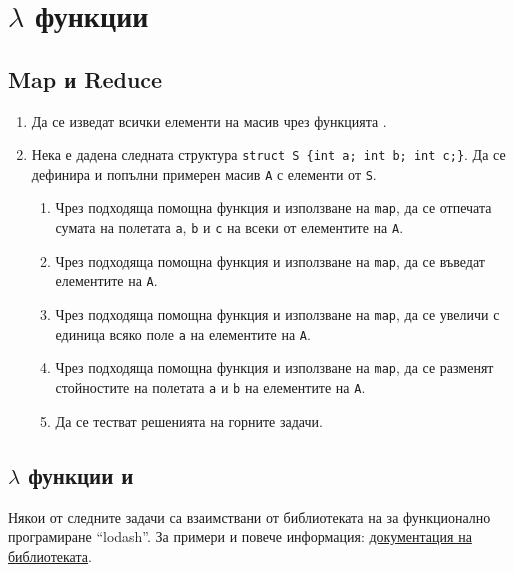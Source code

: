\pagebreak

\clearpage

\section{$\lambda$ функции}

\subsection {Map и Reduce}

\begin{enumerate}[]  
  \item Да се изведат всички елементи на масив чрез функцията .
  
  \item Нека е дадена следната структура \texttt{struct S \{int a; int b; int c;\}}. Да се дефинира и попълни примерен масив \texttt{A} с елементи от  \texttt{S}. 
  
  \begin{enumerate}[label=\alph*)]
    \item Чрез подходяща помощна функция и използване на \texttt{map}, да се отпечата сумата на полетата \texttt{a}, \texttt{b} и \texttt{c} на всеки от елементите на \texttt{A}.
    \item Чрез подходяща помощна функция и използване на \texttt{map}, да се въведат елементите на \texttt{A}.
    \item Чрез подходяща помощна функция и използване на \texttt{map}, да се увеличи с единица всяко поле \texttt{a} на елементите на \texttt{A}.
    \item Чрез подходяща помощна функция и използване на \texttt{map}, да се разменят стойностите на полетата \texttt{a} и \texttt{b} на елементите на \texttt{A}.
    \item Да се тестват решенията на горните задачи.
    
  \end{enumerate}
  
\end{enumerate}

\subsection{$\lambda$ функции и }

\begin{mdframed}[hidealllines=true,backgroundcolor=gray!20]
  Някои от следните задачи са взаимствани от библиотеката на  за функционално програмиране ``lodash''. За примери и повече информация: \href{https://lodash.com/docs/4.17.15#after}{документация на библиотеката}.
\end{mdframed}

